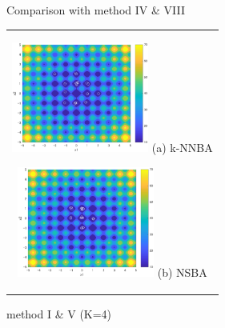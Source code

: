 \documentclass{ies2018}
\begin{document}
\begin{figure}[p]
\centering
{}

\caption{Comparison with method IV \& VIII}
\label{fig:it_iter}
\end{figure}

\begin{figure}[p]
\begin{center}
\begin{tabular}{c}
\begin{minipage}{0.5\hsize}
  \begin{center}
   \includegraphics[width=45mm]{eps/i_k=4_1000.eps}
   \hspace{1.0cm} (a) k-NNBA
  \end{center}
  \label{fig:_k=4_i}
 \end{minipage}

 \begin{minipage}{0.5\hsize}
  \begin{center}
   \includegraphics[width=45mm]{eps/v_k=4_1000.eps}
   \hspace{1.0cm} (b) NSBA
  \end{center}
  \label{fig:k=4_v}
 \end{minipage}
\end{tabular}
\end{center}
\caption{method I \& V (K=4)}
\label{fig:1000_15}
\end{figure}
\end{document}
